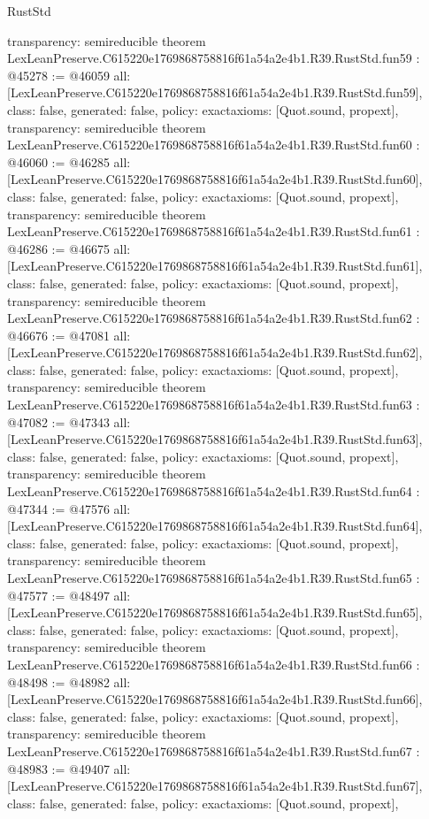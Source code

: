 \begin{lexlean}{RustStd}
\begin{coremodule}
{  transparency: semireducible
}
theorem LexLeanPreserve.C615220e1769868758816f61a54a2e4b1.R39.RustStd.fun59 : @45278 := @46059 {
  all: [LexLeanPreserve.C615220e1769868758816f61a54a2e4b1.R39.RustStd.fun59],
  class: false,
  generated: false,
  policy: exact{axioms: [Quot.sound, propext]},
  transparency: semireducible
}
theorem LexLeanPreserve.C615220e1769868758816f61a54a2e4b1.R39.RustStd.fun60 : @46060 := @46285 {
  all: [LexLeanPreserve.C615220e1769868758816f61a54a2e4b1.R39.RustStd.fun60],
  class: false,
  generated: false,
  policy: exact{axioms: [Quot.sound, propext]},
  transparency: semireducible
}
theorem LexLeanPreserve.C615220e1769868758816f61a54a2e4b1.R39.RustStd.fun61 : @46286 := @46675 {
  all: [LexLeanPreserve.C615220e1769868758816f61a54a2e4b1.R39.RustStd.fun61],
  class: false,
  generated: false,
  policy: exact{axioms: [Quot.sound, propext]},
  transparency: semireducible
}
theorem LexLeanPreserve.C615220e1769868758816f61a54a2e4b1.R39.RustStd.fun62 : @46676 := @47081 {
  all: [LexLeanPreserve.C615220e1769868758816f61a54a2e4b1.R39.RustStd.fun62],
  class: false,
  generated: false,
  policy: exact{axioms: [Quot.sound, propext]},
  transparency: semireducible
}
theorem LexLeanPreserve.C615220e1769868758816f61a54a2e4b1.R39.RustStd.fun63 : @47082 := @47343 {
  all: [LexLeanPreserve.C615220e1769868758816f61a54a2e4b1.R39.RustStd.fun63],
  class: false,
  generated: false,
  policy: exact{axioms: [Quot.sound, propext]},
  transparency: semireducible
}
theorem LexLeanPreserve.C615220e1769868758816f61a54a2e4b1.R39.RustStd.fun64 : @47344 := @47576 {
  all: [LexLeanPreserve.C615220e1769868758816f61a54a2e4b1.R39.RustStd.fun64],
  class: false,
  generated: false,
  policy: exact{axioms: [Quot.sound, propext]},
  transparency: semireducible
}
theorem LexLeanPreserve.C615220e1769868758816f61a54a2e4b1.R39.RustStd.fun65 : @47577 := @48497 {
  all: [LexLeanPreserve.C615220e1769868758816f61a54a2e4b1.R39.RustStd.fun65],
  class: false,
  generated: false,
  policy: exact{axioms: [Quot.sound, propext]},
  transparency: semireducible
}
theorem LexLeanPreserve.C615220e1769868758816f61a54a2e4b1.R39.RustStd.fun66 : @48498 := @48982 {
  all: [LexLeanPreserve.C615220e1769868758816f61a54a2e4b1.R39.RustStd.fun66],
  class: false,
  generated: false,
  policy: exact{axioms: [Quot.sound, propext]},
  transparency: semireducible
}
theorem LexLeanPreserve.C615220e1769868758816f61a54a2e4b1.R39.RustStd.fun67 : @48983 := @49407 {
  all: [LexLeanPreserve.C615220e1769868758816f61a54a2e4b1.R39.RustStd.fun67],
  class: false,
  generated: false,
  policy: exact{axioms: [Quot.sound, propext]},
}
\end{coremodule}
\end{lexlean}
